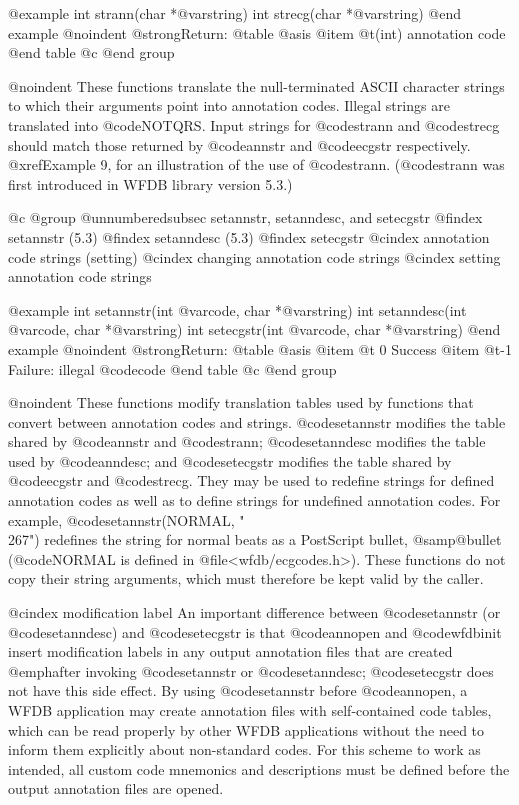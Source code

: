 {{{{{{{{{@example
int strann(char *@var{string})
int strecg(char *@var{string})
@end example
@noindent
@strong{Return:}
@table @asis
@item @t{(int)}
annotation code
@end table
@c @end group

@noindent
These functions translate the null-terminated ASCII character strings to
which their arguments point into annotation codes.  Illegal strings are
translated into @code{NOTQRS}.  Input strings for @code{strann} and
@code{strecg} should match those returned by @code{annstr} and
@code{ecgstr} respectively.  @xref{Example 9}, for an illustration of the
use of @code{strann}. (@code{strann} was first introduced in WFDB library
version 5.3.)

@c @group
@unnumberedsubsec setannstr, setanndesc, and setecgstr
@findex setannstr (5.3)
@findex setanndesc (5.3)
@findex setecgstr
@cindex annotation code strings (setting)
@cindex changing annotation code strings
@cindex setting annotation code strings

@example
int setannstr(int @var{code}, char *@var{string})
int setanndesc(int @var{code}, char *@var{string})
int setecgstr(int @var{code}, char *@var{string})
@end example
@noindent
@strong{Return:}
@table @asis
@item @t{ 0}
Success
@item @t{-1}
Failure: illegal @code{code}
@end table
@c @end group

@noindent
These functions modify translation tables used by functions that
convert between annotation codes and strings.  @code{setannstr} modifies
the table shared by @code{annstr} and @code{strann}; @code{setanndesc}
modifies the table used by @code{anndesc}; and @code{setecgstr} modifies
the table shared by @code{ecgstr} and @code{strecg}.  They may be used
to redefine strings for defined annotation codes as well as to define
strings for undefined annotation codes.  For example,
@code{setannstr(NORMAL, "\\267")} redefines the string for normal beats
as a PostScript bullet, @samp{@bullet{}} (@code{NORMAL} is defined in
@file{<wfdb/ecgcodes.h>}).  These functions do not copy their string
arguments, which must therefore be kept valid by the caller.

@cindex modification label
An important difference between @code{setannstr} (or @code{setanndesc})
and @code{setecgstr} is that @code{annopen} and @code{wfdbinit} insert
modification labels in any output annotation files that are created
@emph{after} invoking @code{setannstr} or @code{setanndesc};
@code{setecgstr} does not have this side effect.  By using
@code{setannstr} before @code{annopen}, a WFDB application may create
annotation files with self-contained code tables, which can be read
properly by other WFDB applications without the need to inform them
explicitly about non-standard codes.  For this scheme to work as
intended, all custom code mnemonics and descriptions must be defined
before the output annotation files are opened.

}}}}}}}}}
